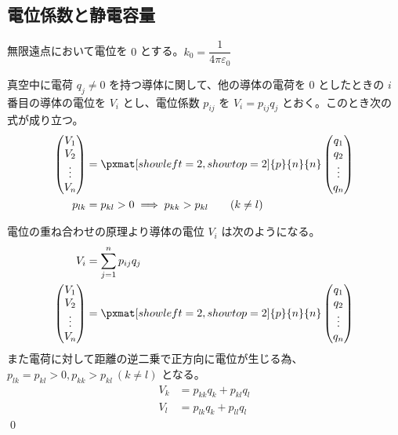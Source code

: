 \documentclass[uplatex,dvipdfmx,a4paper,11pt]{jlreq}
\makeatletter
\newcommand\mqty[1]{\begin{pmatrix}#1\end{pmatrix}}
\numberwithin{equation}{section}
\theoremstyle{definition}
\renewenvironment{proof}[1][\proofname]{\par
  \normalfont
  \topsep6\p@\@plus6\p@ \trivlist
  \item[\hskip\labelsep{\bfseries #1}\@addpunct{\bfseries}]\ignorespaces\quad\par
}{%
  \qed\endtrivlist\@endpefalse
}
\renewcommand\proofname{証明}
\makeatother
\begin{document}
\subsection{電位係数と静電容量}
無限遠点において電位を $0$ とする。$k_0 = \dfrac{1}{4\pi\varepsilon_0}$
\begin{problem}
真空中に電荷 $q_j \neq 0$ を持つ導体に関して、他の導体の電荷を $0$ としたときの $i$ 番目の導体の電位を $V_i$ とし、電位係数 $p_{ij}$ を $V_i = p_{ij}q_j$ とおく。このとき次の式が成り立つ。
\begin{align}
  \mqty{V_1                                                       \\ V_2 \\ \vdots \\ V_n} & = \pxmat[showleft=2,showtop=2]{p}{n}{n}\mqty{q_1 \\ q_2 \\ \vdots \\ q_n} \\
  p_{lk} & = p_{kl} > 0 \implies p_{kk} > p_{kl} \qquad (k\neq l)
\end{align}
\end{problem}
\begin{proof}
  電位の重ね合わせの原理より導体の電位 $V_i$ は次のようになる。
  \begin{align}
    V_i & = \sum_{j=1}^{n}p_{ij}q_j \\
    \mqty{V_1                       \\ V_2 \\ \vdots \\ V_n} & = \pxmat[showleft=2,showtop=2]{p}{n}{n}\mqty{q_1 \\ q_2 \\ \vdots \\ q_n}
  \end{align}
  また電荷に対して距離の逆二乗で正方向に電位が生じる為、$p_{lk} = p_{kl} > 0, p_{kk} > p_{kl}\ (k\neq l)$ となる。
  \begin{align}
    V_k & = p_{kk}q_k + p_{kl}q_l \\
    V_l & = p_{lk}q_k + p_{ll}q_l
  \end{align}
\end{proof}
\end{document}

